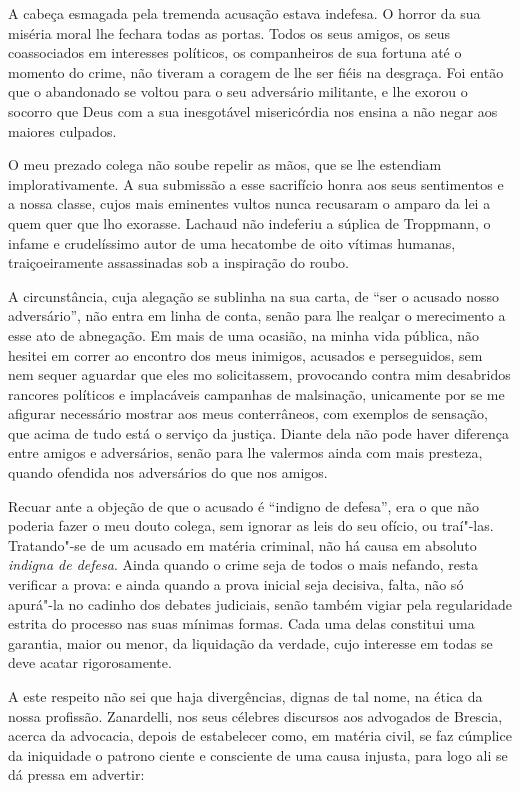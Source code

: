 A cabeça esmagada pela tremenda acusação
estava indefesa. O horror da sua miséria moral lhe fechara todas as
portas. Todos os seus amigos, os seus coassociados em interesses
políticos, os companheiros de sua fortuna até o momento do crime, não
tiveram a coragem de lhe ser fiéis na desgraça. Foi então que o
abandonado se voltou para o seu adversário militante, e lhe exorou o
socorro que Deus com a sua inesgotável misericórdia nos ensina a não
negar aos maiores culpados.

 O meu prezado colega não soube repelir as mãos, que se lhe estendiam
implorativamente. A sua submissão a esse sacrifício honra aos seus
sentimentos e a nossa classe, cujos mais eminentes vultos nunca
recusaram o amparo da lei a quem quer que lho exorasse. Lachaud não
indeferiu a súplica de Troppmann, o infame e crudelíssimo autor de uma
hecatombe de oito vítimas humanas, traiçoeiramente assassinadas sob a
inspiração do roubo. 

A circunstância, cuja alegação se sublinha na sua
carta, de “ser o acusado nosso adversário”, não entra em linha de
conta, senão para lhe realçar o merecimento a esse ato de abnegação. 
Em mais de uma ocasião, na minha vida pública, não hesitei em correr ao
encontro dos meus inimigos, acusados e perseguidos, sem nem sequer
aguardar que eles mo solicitassem, provocando contra mim desabridos
rancores políticos e implacáveis campanhas de malsinação, unicamente
por se me afigurar necessário mostrar aos meus conterrâneos, com
exemplos de sensação, que acima de tudo está o serviço da justiça.
Diante dela não pode haver diferença entre amigos e adversários,
senão para lhe valermos ainda com mais presteza, quando ofendida nos
adversários do que nos amigos. 

Recuar ante a objeção de que o acusado é
“indigno de defesa”, era o que não poderia fazer o meu douto colega,
sem ignorar as leis do seu ofício, ou traí"-las. Tratando"-se de um
acusado em matéria criminal, não há causa em absoluto \textit{indigna
de defesa}. Ainda quando o crime seja de todos o mais nefando, resta
verificar a prova: e ainda quando a prova inicial seja decisiva, falta,
não só apurá"-la no cadinho dos debates judiciais, senão também vigiar
pela regularidade estrita do processo nas suas mínimas formas. Cada
uma delas constitui uma garantia, maior ou menor, da liquidação da
verdade, cujo interesse em todas se deve acatar rigorosamente. 

A este respeito não sei que haja divergências, dignas de tal nome, na ética da
nossa profissão. Zanardelli, nos seus célebres discursos aos advogados
de Brescia, acerca da advocacia, depois de estabelecer como, em
matéria civil, se faz cúmplice da iniquidade o patrono ciente e
consciente de uma causa injusta, para logo ali se dá pressa em advertir: 

